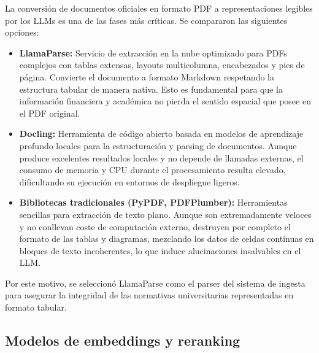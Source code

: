 \documentclass[12pt,a4paper,oneside]{report}
\begin{document}
La conversión de documentos oficiales en formato PDF a representaciones legibles por los LLMs es una de las fases más críticas. Se compararon las siguientes opciones:
\begin{itemize}
    \item \textbf{LlamaParse:} Servicio de extracción en la nube optimizado para PDFs complejos con tablas extensas, layouts multicolumna, encabezados y pies de página. Convierte el documento a formato Markdown respetando la estructura tabular de manera nativa. Esto es fundamental para que la información financiera y académica no pierda el sentido espacial que posee en el PDF original.
    \item \textbf{Docling:} Herramienta de código abierto basada en modelos de aprendizaje profundo locales para la estructuración y parsing de documentos. Aunque produce excelentes resultados locales y no depende de llamadas externas, el consumo de memoria y CPU durante el procesamiento resulta elevado, dificultando su ejecución en entornos de despliegue ligeros.
    \item \textbf{Bibliotecas tradicionales (PyPDF, PDFPlumber):} Herramientas sencillas para extracción de texto plano. Aunque son extremadamente veloces y no conllevan coste de computación externo, destruyen por completo el formato de las tablas y diagramas, mezclando los datos de celdas continuas en bloques de texto incoherentes, lo que induce alucinaciones insalvables en el LLM.
\end{itemize}

Por este motivo, se seleccionó LlamaParse como el parser del sistema de ingesta para asegurar la integridad de las normativas universitarias representadas en formato tabular.

\subsection*{Modelos de embeddings y reranking}
\end{document}
